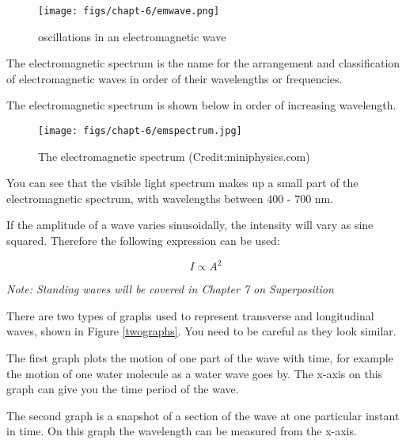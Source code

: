 \documentclass[revision-guide.tex]{subfiles}
\begin{document}
\begin{figure}[h!]
\texttt{[image: figs/chapt-6/emwave.png]}
\centering
\caption{oscillations in an electromagnetic wave}
\label{emwave}
\end{figure}

The electromagnetic spectrum is the name for the arrangement and classification of electromagnetic waves in order of their wavelengths or frequencies.

The electromagnetic spectrum is shown below in order of increasing wavelength.

\begin{figure}[h]
\texttt{[image: figs/chapt-6/emspectrum.jpg]}
\caption{The electromagnetic spectrum (Credit:miniphysics.com)}
\end{figure}

You can see that the visible light spectrum makes up a small part of the electromagnetic spectrum, with wavelengths between 400 - 700 nm.


If the amplitude of a wave varies sinusoidally, the intensity will vary as sine squared. Therefore the following expression can be used:

$$I \propto A^2$$


\emph{Note: Standing waves will be covered in Chapter 7 on Superposition}

There are two types of graphs used to represent transverse and longitudinal waves, shown in Figure \ref{twographs}. You need to be careful as they look similar.

The first graph plots the motion of one part of the wave with time, for example the motion of one water molecule as a water wave goes by. The x-axis on this graph can give you the time period of the wave.

The second graph is a snapshot of a section of the wave at one particular instant in time. On this graph the wavelength can be measured from the x-axis.
\end{document}
